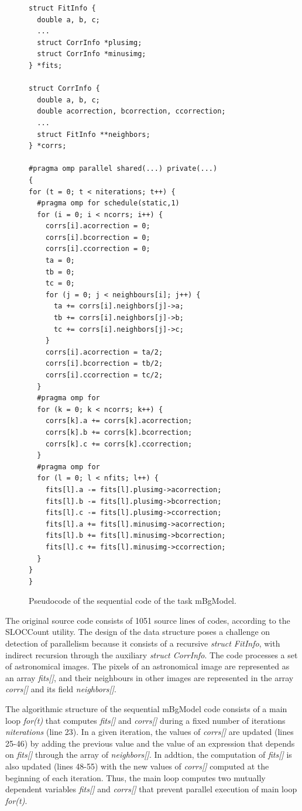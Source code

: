 \begin{figure}[ht]
\centering
\begin{lstlisting}
struct FitInfo {
  double a, b, c;
  ...
  struct CorrInfo *plusimg;
  struct CorrInfo *minusimg;
} *fits;

struct CorrInfo {
  double a, b, c;
  double acorrection, bcorrection, ccorrection;
  ...
  struct FitInfo **neighbors;
} *corrs;

#pragma omp parallel shared(...) private(...)
{
for (t = 0; t < niterations; t++) {
  #pragma omp for schedule(static,1)
  for (i = 0; i < ncorrs; i++) {
    corrs[i].acorrection = 0;
    corrs[i].bcorrection = 0;
    corrs[i].ccorrection = 0;
    ta = 0;
    tb = 0;
    tc = 0;
    for (j = 0; j < neighbours[i]; j++) {
      ta += corrs[i].neighbors[j]->a;
      tb += corrs[i].neighbors[j]->b;
      tc += corrs[i].neighbors[j]->c;
    }
    corrs[i].acorrection = ta/2;
    corrs[i].bcorrection = tb/2;
    corrs[i].ccorrection = tc/2;
  }
  #pragma omp for
  for (k = 0; k < ncorrs; k++) {
    corrs[k].a += corrs[k].acorrection;
    corrs[k].b += corrs[k].bcorrection;
    corrs[k].c += corrs[k].ccorrection;
  }
  #pragma omp for
  for (l = 0; l < nfits; l++) {
    fits[l].a -= fits[l].plusimg->acorrection;
    fits[l].b -= fits[l].plusimg->bcorrection;
    fits[l].c -= fits[l].plusimg->ccorrection;
    fits[l].a += fits[l].minusimg->acorrection;
    fits[l].b += fits[l].minusimg->bcorrection;
    fits[l].c += fits[l].minusimg->ccorrection;
  }
}
}
\end{lstlisting}
\vspace{-10pt}
\caption{Pseudocode of the sequential code of the task mBgModel.}
\vspace{-20pt}
\label{fig:mbgmodel:sequentialcode}
\end{figure}
%
The original source code consists of 1051 source lines of codes, according to the SLOCCount utility. The design of the data structure poses a challenge on detection of parallelism because it consists of a recursive {\em struct FitInfo}, with indirect recursion through the auxiliary {\em struct CorrInfo}. The code processes a set of astronomical images. The pixels of an astronomical image are represented as an array {\em fits[]}, and their neighbours in other images are represented in the array {\em corrs[]} and its field {\em neighbors[]}.

The algorithmic structure of the sequential mBgModel code consists of a main loop {\em for(t)} that computes {\em fits[]} and {\em corrs[]} during a fixed number of iterations {\em niterations} (line 23). In a given iteration, the values of {\em corrs[]} are updated (lines 25-46) by adding the previous value and the value of an expression that depends on {\em fits[]} through the array of {\em neighbors[]}. In addtion, the computation of {\em fits[]} is also updated (lines 48-55) with the new values of {\em corrs[]} computed at the beginning of each iteration. Thus, the main loop computes two mutually dependent variables {\em fits[]} and {\em corrs[]} that prevent parallel execution of  main loop {\em for(t)}.

